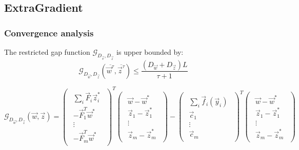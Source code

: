 \subsection*{ExtraGradient}
\subsubsection*{Convergence analysis}
The restricted gap function
$\mathcal{G}_{D_{\vec v}, D_{\vec z}}$ is upper bounded by:
\begin{equation}
  \mathcal{G}_{D_{\vec w}, D_{\vec z}}(\overline{\vec w^{\tau}},
\overline{\vec z^{\tau}}) \leq \frac{\left( D_{\vec w} + D_{\vec z} \right)
L}{\tau + 1}
\label{eq:ub}
\end{equation}

\begin{equation*}
    \mathcal{G}_{D_{\vec w},D_{\vec z}}(\vec w, \vec z)
    =
    \begin{pmatrix}
      \begin{array}{c}
        \sum_i \vec F_i \vec z_i^*\\
	-\vec F_1^T \vec w^*\\
	\vdots\\
	-\vec F_m^T \vec w^*
      \end{array}
    \end{pmatrix}^T
    \begin{pmatrix}
      \begin{array}{c}
	\vec w - \vec w^*\\
	\vec z_1 - \vec z_1^*\\
	\vdots\\
	\vec z_m - \vec z_m^*
      \end{array}
    \end{pmatrix} -
    \begin{pmatrix}
      \begin{array}{c}
	\sum_i \vec f_i(\vec y_i)\\
	\vec c_1\\
	\vdots\\
	\vec c_m
      \end{array}
    \end{pmatrix}^T
    \begin{pmatrix}
      \begin{array}{c}
	\vec w - \vec w^*\\
	\vec z_1 - \vec z_1^*\\
	\vdots\\
	\vec z_m - \vec z_m^*
      \end{array}
    \end{pmatrix}
\end{equation*}

